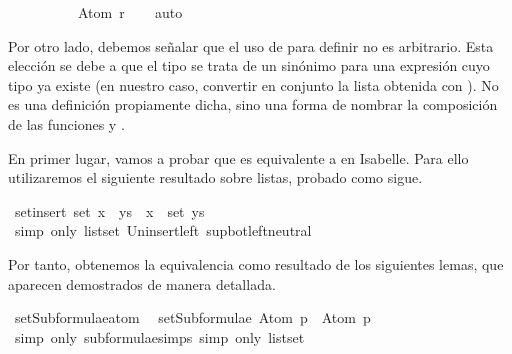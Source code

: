 \begin{isabellebody}
\ \ \ \ \ \ \ \ \ \ Atom\ r{\isacharbraceright}{\isachardoublequoteclose}\isanewline
\ \ \isamarkupfalse%
\ auto%
\endisatagproof
{\isafoldproof}%
%
\isadelimproof
\ \ \ \isanewline
%
\endisadelimproof
{}\isamarkupfalse%
%
\begin{isamarkuptext}%
Por otro lado, debemos señalar que el uso de 
   para definir  no es 
  arbitrario. Esta elección se debe a que el tipo  
  se trata de un sinónimo para una expresión cuyo tipo ya existe (en 
  nuestro caso, convertir en conjunto la lista obtenida con 
  ). No es una definición propiamente dicha, sino 
  una forma de nombrar la composición de las funciones  y 
  .

  En primer lugar, vamos a probar que  es 
  equivalente a  en Isabelle. Para ello utilizaremos el 
  siguiente resultado sobre listas, probado como sigue.%
\end{isamarkuptext}\isamarkuptrue%
\isamarkupfalse%
\ set{\isacharunderscore}insert{\isacharcolon}\ {\isachardoublequoteopen}set\ {\isacharparenleft}x\ {\isacharhash}\ ys{\isacharparenright}\ {\isacharequal}\ {\isacharbraceleft}x{\isacharbraceright}\ {\isasymunion}\ set\ ys{\isachardoublequoteclose}\isanewline
%
\isadelimproof
\ \ %
\endisadelimproof
%
\isatagproof
{}\isamarkupfalse%
\ {\isacharparenleft}simp\ only{\isacharcolon}\ list{\isachardot}set{\isacharparenleft}{}{\isacharparenright}\ Un{\isacharunderscore}insert{\isacharunderscore}left\ sup{\isacharunderscore}bot{\isachardot}left{\isacharunderscore}neutral{\isacharparenright}%
\endisatagproof
{\isafoldproof}%
%
\isadelimproof
%
\endisadelimproof
%
\begin{isamarkuptext}%
Por tanto, obtenemos la equivalencia como resultado de los 
  siguientes lemas, que aparecen demostrados de manera detallada.%
\end{isamarkuptext}\isamarkuptrue%
\isamarkupfalse%
\ setSubformulae{\isacharunderscore}atom{\isacharcolon}\isanewline
\ \ {\isachardoublequoteopen}setSubformulae\ {\isacharparenleft}Atom\ p{\isacharparenright}\ {\isacharequal}\ {\isacharbraceleft}Atom\ p{\isacharbraceright}{\isachardoublequoteclose}\isanewline
%
\isadelimproof
\ \ \ \ %
\endisadelimproof
%
\isatagproof
{}\isamarkupfalse%
\ {\isacharparenleft}simp\ only{\isacharcolon}\ subformulae{\isachardot}simps{\isacharparenleft}{}{\isacharparenright}{\isacharcomma}\ simp\ only{\isacharcolon}\ list{\isachardot}set{\isacharparenright}%

\end{isabellebody}

